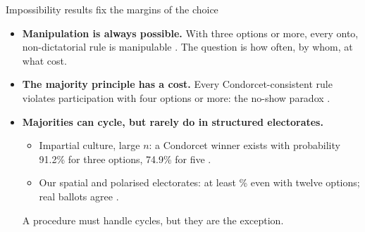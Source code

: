 \documentclass[10pt,aspectratio=169]{beamer}
\begin{document}
\begin{frame}{Impossibility results fix the margins of the choice}
  \begin{itemize}
    \item \textbf{Manipulation is always possible.} With three options or more, every onto,
      non-dictatorial rule is manipulable . The question is
      how often, by whom, at what cost.
    \item \textbf{The majority principle has a cost.} Every Condorcet-consistent rule violates
      participation with four options or more: the no-show paradox .
    \item \textbf{Majorities can cycle, but rarely do in structured electorates.}
      \begin{itemize}
        \item Impartial culture, large $n$: a Condorcet winner exists with probability 91.2\% for three
          options, 74.9\% for five .
        \item Our spatial and polarised electorates: at least \KNcwPolarisedTwelve\% even with twelve
          options; real ballots agree .
      \end{itemize}
      A procedure must handle cycles, but they are the exception.
  \end{itemize}
\end{frame}
\end{document}
